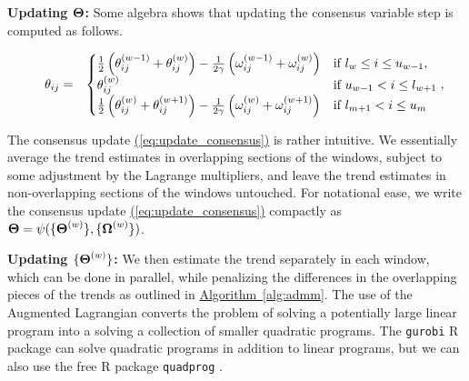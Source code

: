 \documentclass[aoas]{imsart}
\newcommand{\Eqn}[1]{\hyperref[eq:#1]{{\rm (\ref*{eq:#1})}}} %
\newcommand{\Alg}[1]{\hyperref[alg:#1]{Algorithm~\ref*{alg:#1}}} %
\newcommand{\Eqn}[1]{{(\ref{eq:#1})}} %
\newcommand{\Alg}[1]{{Algorithm~\ref{alg:#1}}} %
\newcommand{\M}[1]{{\bm{\mathbf{\MakeUppercase{#1}}}}} %
\newcommand{\ME}[2]{\MakeLowercase{#1}_{#2}} %
\newcommand{\Mn}[2]{\M{#1}^{(#2)}} %
\newcommand{\MnE}[3]{\MakeLowercase{#1}^{(#2)}_{#3}} %
\begin{document}
{\bf Updating $\M{\Theta}$: } Some algebra shows that updating the consensus variable step is computed as follows.

\begin{eqnarray}
\label{eq:update_consensus}
~~~~\ME{\theta}{ij}	 &=& \begin{cases}
\frac{1}{2}\left (\MnE{\theta}{w-1}{ij} + \MnE{\theta}{w}{ij} \right)
-
\frac{1}{2\gamma} \left (\MnE{\omega}{w-1}{ij} + \MnE{\omega}{w}{ij} \right)
& \mbox{if~} l_{w} \le i \le u_{w-1},  \\
\MnE{\theta}{w}{ij} & \mbox{if~} u_{w-1} < i \le l_{w+1}  \\
\frac{1}{2} \left ( \MnE{\theta}{w}{ij} + \MnE{\theta}{w+1}{ij} \right )
-
\frac{1}{2\gamma}	\left (\MnE{\omega}{w}{ij} + \MnE{\omega}{w+1}{ij} \right )
& \mbox{if~} l_{m+1} < i \le u_{m}
\end{cases},
\end{eqnarray}

The consensus update \Eqn{update_consensus} is rather intuitive. We essentially average the trend estimates in overlapping sections of the windows, subject to some adjustment by the Lagrange multipliers, and leave the trend estimates in non-overlapping sections of the windows untouched.
For notational ease, we write the consensus update \Eqn{update_consensus} compactly as $\M{\Theta} = \psi(\{\Mn{\Theta}{w}\},\{\Mn{\Omega}{w}\})$.

{\bf Updating $\{\Mn{\Theta}{w}\}$: } We then estimate the trend separately in each window, which can be done in parallel, while penalizing the differences in the overlapping pieces of the trends  as outlined in \Alg{admm}. The use of the Augmented Lagrangian converts the problem of solving a potentially large linear program into a solving a collection of smaller quadratic programs. The \texttt{gurobi} R package \citep{gurobi} can solve quadratic programs in addition to linear programs, but we can also use the free R package \texttt{quadprog} \citep{quadprog}.
\end{document}
